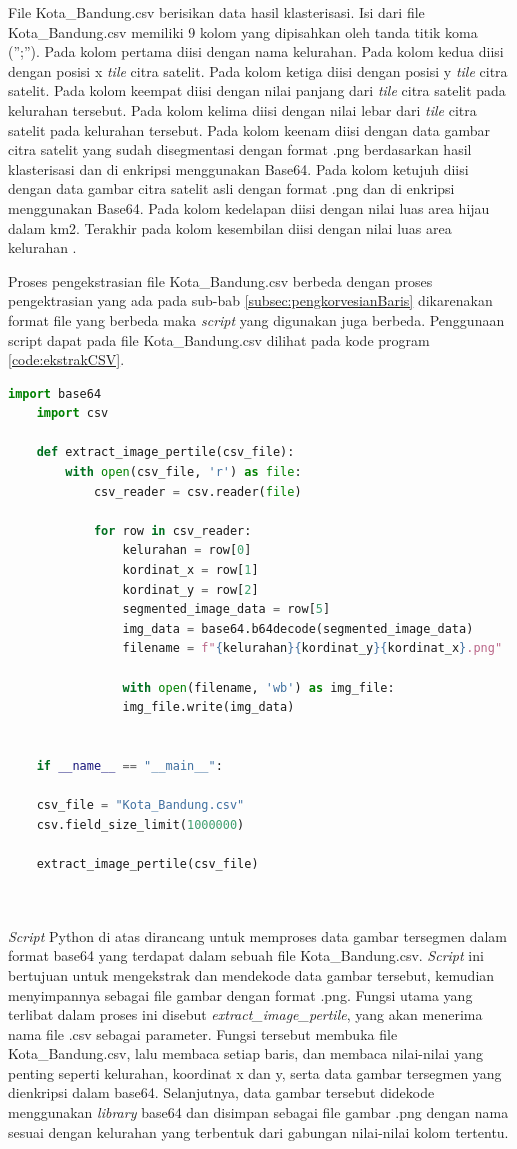 File Kota\_Bandung.csv berisikan data hasil klasterisasi. Isi dari file Kota\_Bandung.csv memiliki 9 kolom yang dipisahkan oleh tanda titik koma (”;”). Pada kolom pertama diisi dengan nama kelurahan. Pada kolom kedua diisi dengan posisi x \textit{tile} citra satelit. Pada kolom ketiga diisi dengan posisi y \textit{tile} citra satelit. Pada kolom keempat diisi dengan nilai panjang dari \textit{tile} citra satelit pada kelurahan tersebut. Pada kolom kelima diisi dengan nilai lebar dari \textit{tile} citra satelit pada kelurahan tersebut. Pada kolom keenam diisi dengan data gambar citra satelit yang sudah disegmentasi dengan format .png berdasarkan hasil klasterisasi dan di enkripsi menggunakan Base64. Pada kolom ketujuh diisi dengan data gambar citra satelit asli dengan format .png dan di enkripsi menggunakan Base64. Pada kolom kedelapan diisi dengan nilai luas area hijau dalam km2. Terakhir pada kolom kesembilan diisi dengan nilai luas area kelurahan\cite{juan:22:pengumpulan} .

Proses pengekstrasian file Kota\_Bandung.csv berbeda dengan proses pengektrasian yang ada pada sub-bab \ref{subsec:pengkorvesianBaris} dikarenakan format file yang berbeda maka \textit{script} yang digunakan juga berbeda. Penggunaan script dapat pada file Kota\_Bandung.csv dilihat pada kode program \ref{code:ekstrakCSV}. 
\begin{lstlisting}[language=Python, caption=Script Penggabungan Gambar Hasil Klasterisasi ,label={code:ekstrakCSV}]
	import base64
	import csv
	
	def extract_image_pertile(csv_file):
		with open(csv_file, 'r') as file:
			csv_reader = csv.reader(file)
	
			for row in csv_reader:
				kelurahan = row[0]
				kordinat_x = row[1]
				kordinat_y = row[2]
				segmented_image_data = row[5]
				img_data = base64.b64decode(segmented_image_data)
				filename = f"{kelurahan}{kordinat_y}{kordinat_x}.png"
				
				with open(filename, 'wb') as img_file:
				img_file.write(img_data)
	
	
	if __name__ == "__main__":
	
	csv_file = "Kota_Bandung.csv"
	csv.field_size_limit(1000000)
	
	extract_image_pertile(csv_file)
	
	
\end{lstlisting}

\textit{Script} Python di atas dirancang untuk memproses data gambar tersegmen dalam format base64 yang terdapat dalam sebuah file Kota\_Bandung.csv. \textit{Script} ini  bertujuan untuk mengekstrak dan mendekode data gambar tersebut, kemudian menyimpannya sebagai file gambar dengan format .png. Fungsi utama yang terlibat dalam proses ini disebut \textit{extract\_image\_pertile}, yang akan menerima nama file .csv sebagai parameter. Fungsi tersebut membuka file Kota\_Bandung.csv, lalu membaca setiap baris, dan membaca nilai-nilai yang penting seperti kelurahan, koordinat x dan y, serta data gambar tersegmen yang dienkripsi dalam base64. Selanjutnya, data gambar tersebut didekode menggunakan \textit{library }base64 dan disimpan sebagai file gambar .png dengan nama sesuai dengan kelurahan yang terbentuk dari gabungan nilai-nilai kolom tertentu.

